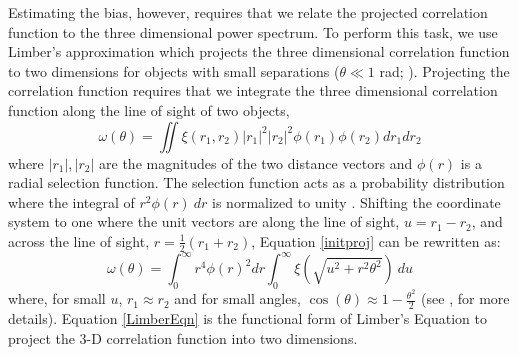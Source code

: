 \documentclass[apj, numberedappendix]{emulateapj}
\begin{document}
Estimating the bias, however, requires that we relate the projected correlation function to the three dimensional power spectrum. To perform this task, we use Limber's approximation which projects the three dimensional correlation function to two dimensions \citep{Limber1953} for objects with small separations ($\theta \ll 1$ rad; \citealt{Simon2007}). Projecting the correlation function requires that we integrate the three dimensional correlation function along the line of sight of two objects,
\begin{equation}\label{initproj}
\omega(\theta) = \iint \xi(r_1,r_2) \lvert r_1\rvert ^2 \lvert r_2 \rvert ^2 \phi(r_1)\phi(r_2)dr_1dr_2
\end{equation}
where $\lvert r_1\rvert, \lvert r_2 \rvert$ are the magnitudes of the two distance vectors and $\phi(r)$ is a radial selection function. The selection function acts as a probability distribution where the integral of  $r^2\phi(r)\ dr$ is normalized to unity \citep{Brewer2008}. Shifting the coordinate system to one where the unit vectors are along the line of sight, $u=r_1-r_2$, and across the line of sight, $r = \frac{1}{2}(r_1+r_2)$, Equation \eqref{initproj} can be rewritten as:
\begin{equation}\label{LimberEqn}
\omega(\theta) = \int_{0}^{\infty} r^4\phi(r)^2 dr \int_{0}^{\infty} \xi(\sqrt{u^2 + r^2\theta^2})\ du
\end{equation}
where, for small $u$, $r_1 \approx r_2$ and  for small angles, $\cos(\theta) \approx 1-\frac{\theta^2}{2}$ (see \citealt{Peebles1980}, \citealt{Brewer2008} for more details). Equation \eqref{LimberEqn} is the functional form of Limber's Equation to project the 3-D correlation function into two dimensions.
\end{document}
